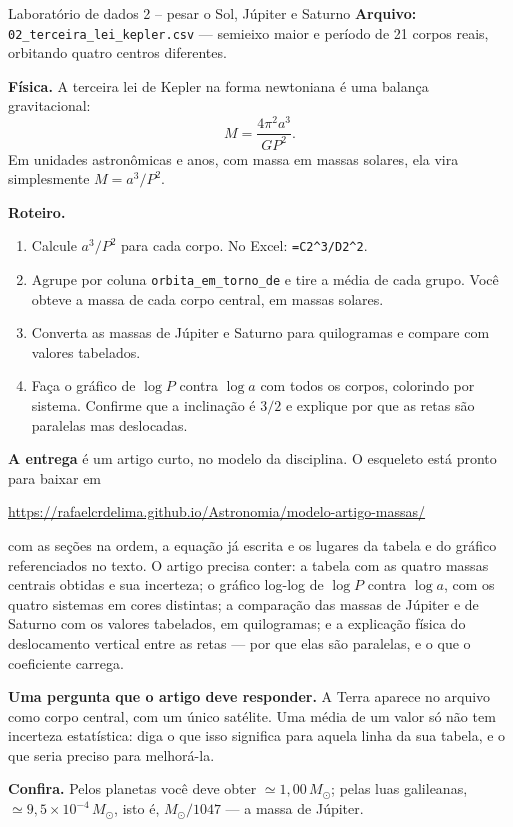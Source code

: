 \documentclass[11pt,a4paper]{article}
\begin{document}
\begin{lessonblock}[borderline west={2pt}{0pt}{astroGold}]{Laboratório de dados 2 -- pesar o Sol, Júpiter e Saturno}
\textbf{Arquivo:} \texttt{02\_terceira\_lei\_kepler.csv} --- semieixo maior e período de 21 corpos reais, orbitando quatro centros diferentes.

\textbf{Física.} A terceira lei de Kepler na forma newtoniana é uma balança gravitacional:
\[
M=\frac{4\pi^{2}a^{3}}{GP^{2}}.
\]
Em unidades astronômicas e anos, com massa em massas solares, ela vira simplesmente $M=a^{3}/P^{2}$.

\textbf{Roteiro.}
\begin{enumerate}
\item Calcule $a^{3}/P^{2}$ para cada corpo. No Excel: \texttt{=C2\^{}3/D2\^{}2}.
\item Agrupe por coluna \texttt{orbita\_em\_torno\_de} e tire a média de cada grupo. Você obteve a massa de cada corpo central, em massas solares.
\item Converta as massas de Júpiter e Saturno para quilogramas e compare com valores tabelados.
\item Faça o gráfico de $\log P$ contra $\log a$ com todos os corpos, colorindo por sistema. Confirme que a inclinação é $3/2$ e explique por que as retas são paralelas mas deslocadas.
\end{enumerate}

\textbf{A entrega} é um artigo curto, no modelo da disciplina. O esqueleto está pronto para baixar em
\begin{center}
\url{https://rafaelcrdelima.github.io/Astronomia/modelo-artigo-massas/}
\end{center}
com as seções na ordem, a equação já escrita e os lugares da tabela e do gráfico referenciados no texto. O artigo precisa conter: a tabela com as quatro massas centrais obtidas e sua incerteza; o gráfico log-log de $\log P$ contra $\log a$, com os quatro sistemas em cores distintas; a comparação das massas de Júpiter e de Saturno com os valores tabelados, em quilogramas; e a explicação física do deslocamento vertical entre as retas --- por que elas são paralelas, e o que o coeficiente carrega.

\textbf{Uma pergunta que o artigo deve responder.} A Terra aparece no arquivo como corpo central, com um único satélite. Uma média de um valor só não tem incerteza estatística: diga o que isso significa para aquela linha da sua tabela, e o que seria preciso para melhorá-la.

\textbf{Confira.} Pelos planetas você deve obter $\simeq1{,}00\,M_\odot$; pelas luas galileanas, $\simeq9{,}5\times10^{-4}\,M_\odot$, isto é, $M_\odot/1047$ --- a massa de Júpiter.
\end{lessonblock}
\end{document}

